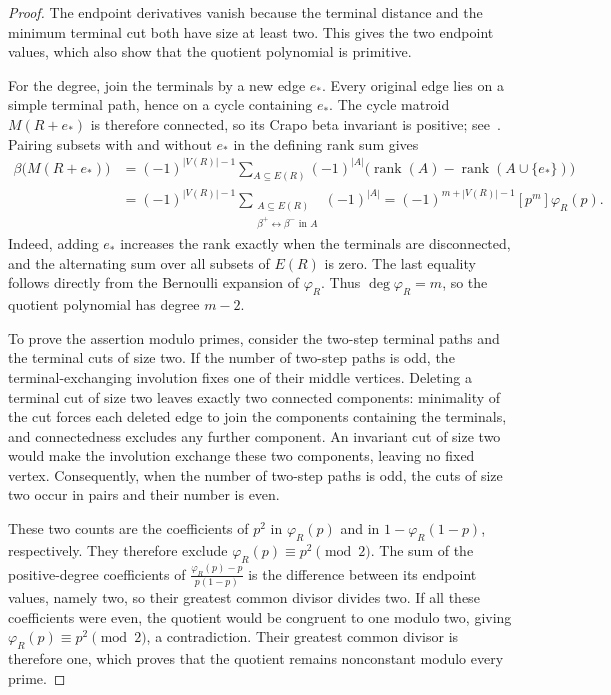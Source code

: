\documentclass[scheme=plain,11pt]{ctexart}
\theoremstyle{definition}
\theoremstyle{remark}
\begin{document}
\begin{proof}
The endpoint derivatives vanish because the terminal distance and the minimum terminal cut both have size at least two.
This gives the two endpoint values, which also show that the quotient polynomial is primitive.

For the degree, join the terminals by a new edge $e_*$.
Every original edge lies on a simple terminal path, hence on a cycle containing $e_*$.
The cycle matroid $M(R+e_*)$ is therefore connected, so its Crapo beta invariant is positive; see~\cite{oxley1982crapo}.
Pairing subsets with and without $e_*$ in the defining rank sum gives
\begin{align*}
 \beta\bigl(M(R+e_*)\bigr)
 &=(-1)^{|V(R)|-1}
   \sum_{A\subseteq E(R)}(-1)^{|A|}
   \bigl(\operatorname{rank}(A)-\operatorname{rank}(A\cup\{e_*\})\bigr)\\
 &=(-1)^{|V(R)|-1}
   \sum_{\substack{A\subseteq E(R)\\\beta^+\leftrightarrow\beta^-\text{ in }A}}(-1)^{|A|}
 =(-1)^{m+|V(R)|-1}[p^m]\varphi_R(p).
\end{align*}
Indeed, adding $e_*$ increases the rank exactly when the terminals are disconnected, and the alternating sum over all subsets of $E(R)$ is zero.
The last equality follows directly from the Bernoulli expansion of $\varphi_R$.
Thus $\deg\varphi_R=m$, so the quotient polynomial has degree $m-2$.

To prove the assertion modulo primes, consider the two-step terminal paths and the terminal cuts of size two.
If the number of two-step paths is odd, the terminal-exchanging involution fixes one of their middle vertices.
Deleting a terminal cut of size two leaves exactly two connected components: minimality of the cut forces each deleted edge to join the components containing the terminals, and connectedness excludes any further component.
An invariant cut of size two would make the involution exchange these two components, leaving no fixed vertex.
Consequently, when the number of two-step paths is odd, the cuts of size two occur in pairs and their number is even.

These two counts are the coefficients of $p^2$ in $\varphi_R(p)$ and in $1-\varphi_R(1-p)$, respectively.
They therefore exclude $\varphi_R(p)\equiv p^2\pmod2$.
The sum of the positive-degree coefficients of $\frac{\varphi_R(p)-p}{p(1-p)}$ is the difference between its endpoint values, namely two, so their greatest common divisor divides two.
If all these coefficients were even, the quotient would be congruent to one modulo two, giving $\varphi_R(p)\equiv p^2\pmod2$, a contradiction.
Their greatest common divisor is therefore one, which proves that the quotient remains nonconstant modulo every prime.
\end{proof}
\end{document}
